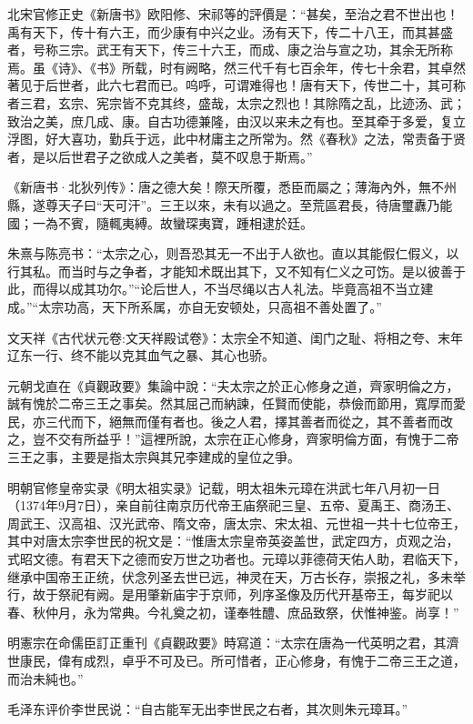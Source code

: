 北宋官修正史《新唐书》欧阳修、宋祁等的評價是：“甚矣，至治之君不世出也！禹有天下，传十有六王，而少康有中兴之业。汤有天下，传二十八王，而其甚盛者，号称三宗。武王有天下，传三十六王，而成、康之治与宣之功，其余无所称焉。虽《诗》、《书》所载，时有阙略，然三代千有七百余年，传七十余君，其卓然著见于后世者，此六七君而已。呜呼，可谓难得也！唐有天下，传世二十，其可称者三君，玄宗、宪宗皆不克其终，盛哉，太宗之烈也！其除隋之乱，比迹汤、武；致治之美，庶几成、康。自古功德兼隆，由汉以来未之有也。至其牵于多爱，复立浮图，好大喜功，勤兵于远，此中材庸主之所常为。然《春秋》之法，常责备于贤者，是以后世君子之欲成人之美者，莫不叹息于斯焉。”

《新唐书·北狄列传》：唐之德大矣！際天所覆，悉臣而屬之；薄海內外，無不州縣，遂尊天子曰“天可汗”。三王以來，未有以過之。至荒區君長，待唐璽纛乃能國；一為不賓，隨輒夷縛。故蠻琛夷寶，踵相逮於廷。

朱熹与陈亮书：“太宗之心，则吾恐其无一不出于人欲也。直以其能假仁假义，以行其私。而当时与之争者，才能知术既出其下，又不知有仁义之可饬。是以彼善于此，而得以成其功尔。”“论后世人，不当尽绳以古人礼法。毕竟高祖不当立建成。”“太宗功高，天下所系属，亦自无安顿处，只高祖不善处置了。”

文天祥《古代状元卷:文天祥殿试卷》：太宗全不知道、闺门之耻、将相之夸、末年辽东一行、终不能以克其血气之暴、其心也骄。

元朝戈直在《貞觀政要》集論中說：“夫太宗之於正心修身之道，齊家明倫之方，誠有愧於二帝三王之事矣。然其屈己而納諫，任賢而使能，恭儉而節用，寬厚而愛民，亦三代而下，絕無而僅有者也。後之人君，擇其善者而從之，其不善者而改之，豈不交有所益乎！”這裡所說，太宗在正心修身，齊家明倫方面，有愧于二帝三王之事，主要是指太宗與其兄李建成的皇位之爭。

明朝官修皇帝实录《明太祖实录》记载，明太祖朱元璋在洪武七年八月初一日（1374年9月7日），亲自前往南京历代帝王庙祭祀三皇、五帝、夏禹王、商汤王、周武王、汉高祖、汉光武帝、隋文帝，唐太宗、宋太祖、元世祖一共十七位帝王，其中对唐太宗李世民的祝文是：“惟唐太宗皇帝英姿盖世，武定四方，贞观之治，式昭文德。有君天下之德而安万世之功者也。元璋以菲德荷天佑人助，君临天下，继承中国帝王正统，伏念列圣去世已远，神灵在天，万古长存，崇报之礼，多未举行，故于祭祀有阙。是用肇新庙宇于京师，列序圣像及历代开基帝王，每岁祀以春、秋仲月，永为常典。今礼奠之初，谨奉牲醴、庶品致祭，伏惟神鉴。尚享！”

明憲宗在命儒臣訂正重刊《貞觀政要》時寫道：“太宗在唐為一代英明之君，其濟世康民，偉有成烈，卓乎不可及已。所可惜者，正心修身，有愧于二帝三王之道，而治未純也。”

毛泽东评价李世民说：“自古能军无出李世民之右者，其次则朱元璋耳。”

